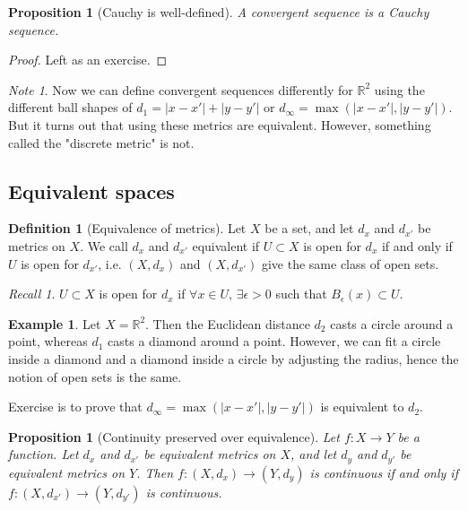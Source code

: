\documentclass{article}
\theoremstyle{definition}
\newtheorem{defn}{Definition}[section]
\newtheorem{exmp}{Example}[section]
\theoremstyle{plain}%
\newtheorem{prop}[thm]{Proposition}
\theoremstyle{remark}
\newtheorem*{note}{Note}
\newtheorem*{rec}{Recall}
\newcommand{\R}{\mathbb{R}}
\begin{document}
\begin{prop}[Cauchy is well-defined]
A convergent sequence is a Cauchy sequence.
\end{prop}

\begin{proof}
Left as an exercise.
\end{proof}

\begin{note}
Now we can define convergent sequences differently for $\R^2$ using the different ball shapes of $d_1 = |x-x'| + |y-y'|$ or $d_{\infty} = \max(|x-x'|, |y-y'|)$. But it turns out that using these metrics are equivalent. However, something called the "discrete metric" is not.
\end{note}

\subsection{Equivalent spaces}

\begin{defn}[Equivalence of metrics]
Let $X$ be a set, and let $d_x$ and $d_{x'}$ be metrics on $X$. We call $d_x$ and $d_{x'}$ equivalent if $U \subset X$ is open for $d_x$ if and only if $U$ is open for $d_{x'}$, i.e. $(X,d_x)$ and $(X, d_{x'})$ give the same class of open sets.
\end{defn}

\begin{rec}
$U \subset X$ is open for $d_x$ if $\forall x \in U$, $\exists \epsilon > 0$ such that $B_{\epsilon}(x) \subset U$.
\end{rec}

\begin{exmp}
Let $X = \R^2$. Then the Euclidean distance $d_2$ casts a circle around a point, whereas $d_1$ casts a diamond around a point. However, we can fit a circle inside a diamond and a diamond inside a circle by adjusting the radius, hence the notion of open sets is the same.

Exercise is to prove that $d_{\infty} = \max(|x-x'|, |y-y'|)$ is equivalent to $d_2$.
\end{exmp}

\begin{prop}[Continuity preserved over equivalence]
Let $f : X \to Y$ be a function. Let $d_x$ and $d_{x'}$ be equivalent metrics on $X$, and let $d_y$ and $d_{y'}$ be equivalent metrics on $Y$. Then $f: (X,d_x) \to (Y,d_y)$ is continuous if and only if $f: (X, d_{x'}) \to (Y, d_{y'})$ is continuous.
\end{prop}
\end{document}
